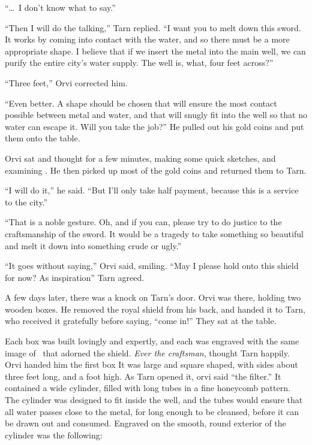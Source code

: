 ``\ldots\ I don't know what to say.''

``Then I will do the talking,'' Tarn replied.  ``I want you to melt down this sword.  It works by coming into contact with the water, and so there must be a more appropriate shape.  I believe that if we insert the metal into the main well, we can purify the entire city's water supply.  The well is, what, four feet across?''

``Three feet,'' Orvi corrected him.

``Even better.  A shape should be chosen that will ensure the most contact possible between metal and water, and that will snugly fit into the well so that no water can escape it.  Will you take the job?''  He pulled out his gold coins and put them onto the table.

Orvi sat and thought for a few minutes, making some quick sketches, and examining \kildir.  He then picked up most of the gold coins and returned them to Tarn.

``I will do it,'' he said.  ``But I'll only take half payment, because this is a service to the city.''

``That is a noble gesture.  Oh, and if you can, please try to do justice to the craftsmanship of the sword.  It would be a tragedy to take something so beautiful and melt it down into something crude or ugly.''

``It goes without saying,'' Orvi said, smiling.  ``May I please hold onto this shield for now?  As inspiration''  Tarn agreed.

\divider

A few days later, there was a knock on Tarn's door.  Orvi was there, holding two wooden boxes.  He removed the royal shield from his back, and handed it to Tarn, who received it gratefully before saying, ``come in!''  They sat at the table.

Each box was built lovingly and expertly, and each was engraved with the same image of \valdunmir\ that adorned the shield.  \emph{Ever the craftsman}, thought Tarn happily.  Orvi handed him the first box  It was large and square shaped, with sides about three feet long, and a foot high.  As Tarn opened it, orvi said ``the filter.''  It contained a wide cylinder, filled with long tubes in a fine honeycomb pattern.  The cylinder was designed to fit inside the well, and the tubes would ensure that all water passes close to the metal, for long enough to be cleansed, before it can be drawn out and consumed.  Engraved on the smooth, round exterior of the cylinder was the following:

